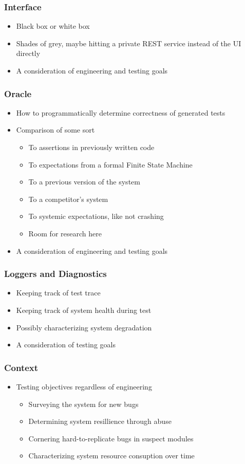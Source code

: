 \begin{frame}
  \frametitle{Interface}
  \begin{itemize}
    \item Black box or white box
    \item Shades of grey, maybe hitting a private REST service instead of the UI directly
    \item A consideration of engineering and testing goals
  \end{itemize}
  \citep{HoffmanTradeoffs}
\end{frame}

\begin{frame}
  \frametitle{Oracle}
  \begin{itemize}
    \item How to programmatically determine correctness of generated tests
    \item Comparison of some sort
    \begin{itemize}
      \item To assertions in previously written code
      \item To expectations from a formal Finite State Machine
      \item To a previous version of the system
      \item To a competitor's system
      \item To systemic expectations, like not crashing
      \item Room for research here
    \end{itemize}
    \item A consideration of engineering and testing goals
  \end{itemize}
\end{frame}

\begin{frame}
  \frametitle{Loggers and Diagnostics}
  \begin{itemize}
    \item Keeping track of test trace
    \item Keeping track of system health during test
    \item Possibly characterizing system degradation
    \item A consideration of testing goals
  \end{itemize}
\end{frame}

\begin{frame}
  \frametitle{Context}
  \begin{itemize}
    \item Testing objectives regardless of engineering
    \begin{itemize}
      \item Surveying the system for new bugs
      \item Determining system resillience through abuse
      \item Cornering hard-to-replicate bugs in suspect modules
      \item Characterizing system resource consuption over time
    \end{itemize}
  \end{itemize}
\end{frame}

